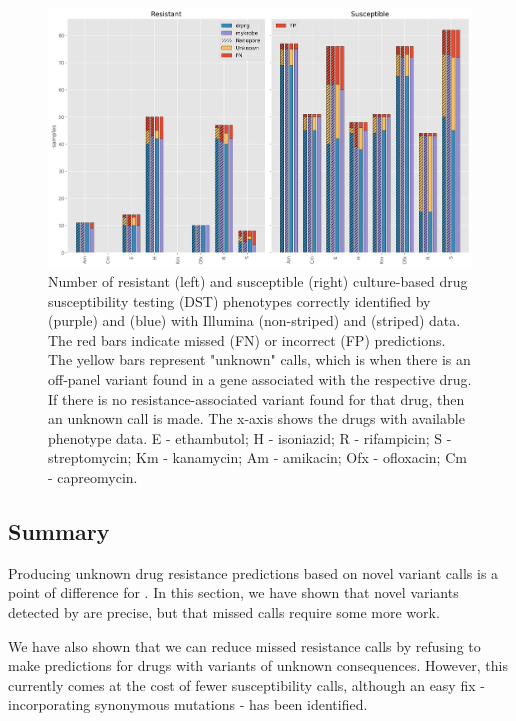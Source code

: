 \begin{figure}
\begin{center}
\includegraphics[width=0.90\columnwidth]{Chapter3/Figs/pheno_unknown.png}
\caption{{Number of resistant (left) and susceptible (right) culture-based drug susceptibility testing (DST) phenotypes correctly identified by \mykrobe{} (purple) and \drprg{} (blue) with Illumina (non-striped) and \ont{} (striped) data. The red bars indicate missed (FN) or incorrect (FP) predictions. The yellow bars represent \drprg{} "unknown" calls, which is when there is an off-panel variant found in a gene associated with the respective drug. If there is no resistance-associated variant found for that drug, then an unknown call is made. The x-axis shows the drugs with available phenotype data. E - ethambutol; H - isoniazid; R - rifampicin; S - streptomycin; Km - kanamycin; Am - amikacin; Ofx - ofloxacin; Cm - capreomycin.
{\label{fig:pheno-unknown}}
}}
\end{center}
\end{figure}

\subsection{Summary}

Producing unknown drug resistance predictions based on novel variant calls is a point of difference for \drprg{}. In this section, we have shown that novel variants detected by \drprg{} are precise, but that missed calls require some more work.

We have also shown that we can reduce missed resistance calls by refusing to make predictions for drugs with variants of unknown consequences. However, this currently comes at the cost of fewer susceptibility calls, although an easy fix - incorporating synonymous mutations - has been identified.

